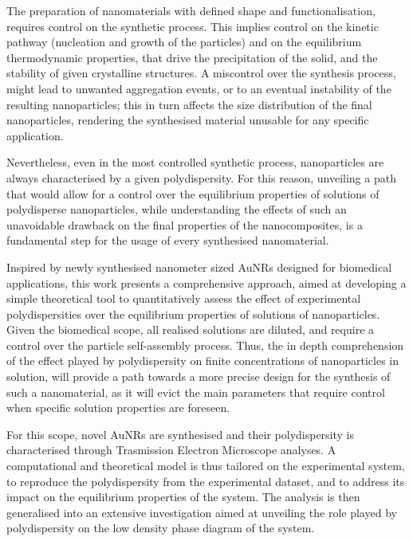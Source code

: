\documentclass[journal=jacsat,manuscript=article]{achemso}
\begin{document}
The preparation of  nanomaterials with defined shape and functionalisation, requires  control on the synthetic process. This implies control on the kinetic pathway (nucleation and growth of the particles) and on the equilibrium thermodynamic properties, that drive the precipitation of the solid, and the stability of given crystalline structures. 
A miscontrol over the synthesis process, might lead to unwanted aggregation events, or to an eventual instability of the resulting nanoparticles; this in turn affects the size distribution of the final nanoparticles, rendering the synthesised material unusable for any specific application.


Nevertheless, even in the most controlled synthetic process, nanoparticles are always characterised by a given polydispersity. For this reason, unveiling a path that would allow for a control over the equilibrium properties of solutions of polydisperse nanoparticles, while understanding the effects of such an unavoidable drawback on the final properties of the nanocomposites, is a fundamental step for the usage of every synthesised nanomaterial.


Inspired by newly synthesised nanometer sized AuNRs designed for biomedical applications, this work presents a comprehensive approach, aimed at developing a simple theoretical tool to quantitatively assess the  effect of  experimental polydispersities over the equilibrium properties of solutions of nanoparticles.  Given the biomedical scope, all realised solutions are diluted, and require a control over the particle self-assembly process. Thus, the in depth comprehension of the effect played by polydispersity on finite concentrations of nanoparticles in solution,  will provide a path towards a more precise design for the synthesis of such a  nanomaterial, as it will evict the main parameters that require control when specific solution properties are foreseen. 

For this scope, novel AuNRs are synthesised and their polydispersity is characterised through Trasmission Electron Microscope analyses.
A computational and theoretical model is thus tailored on the experimental system, to reproduce the polydispersity from the experimental dataset, and to address its impact on the equilibrium properties of the system. The analysis is then generalised into an extensive investigation aimed at unveiling the role played by polydispersity on the low density phase diagram of the system. 
\end{document}
